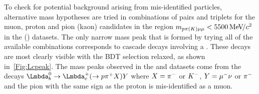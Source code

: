 

  
To check for potential background arising from mis-identified particles, alternative mass hypotheses are tried in combinations of pairs and triplets for the muon, proton and pion (kaon) candidates in the region $m_{p\pi({K})\mu\mu}<5500{\mathrm{\,Me\kern -0.1em V\!/}c^2}$ in the \Lbpi (\LbK) datasets. The only narrow mass peak that is formed by trying all of the available combinations corresponds to cascade decays involving a \Lc. These decays are most clearly visible with the BDT selection relaxed, as shown in~\autoref{Fig:Lcpeak}. The \Lc mass peaks observed in the \Lbpi and \LbK datasets come from the decays $\Lb \to \Lc (\to \proton \pip X) Y$ where $X = {{\pi}^-}$ or ${{K}^-}$, $Y={\mu^-}\nu$ or ${{\pi}^-}$ and the pion with the same sign as the proton is mis-identified as a muon. 

